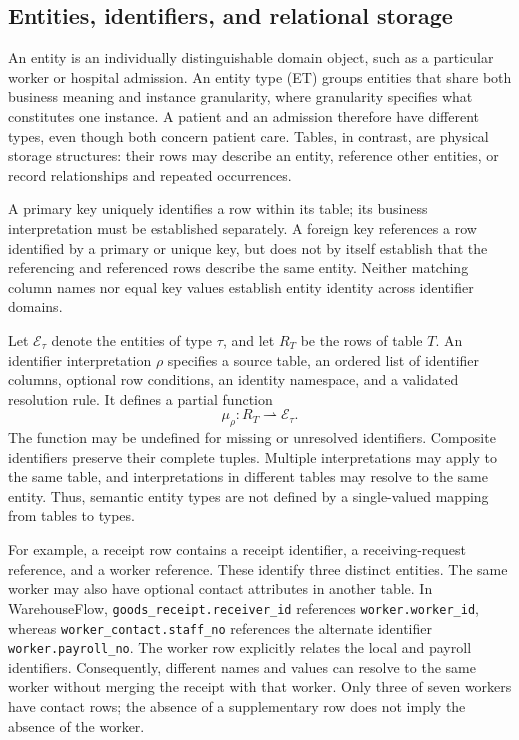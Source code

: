 \subsection{Entities, identifiers, and relational storage}
An entity is an individually distinguishable domain object, such as a particular worker or hospital admission. An entity type (ET) groups entities that share both business meaning and instance granularity, where granularity specifies what constitutes one instance. A patient and an admission therefore have different types, even though both concern patient care. Tables, in contrast, are physical storage structures: their rows may describe an entity, reference other entities, or record relationships and repeated occurrences.

A primary key uniquely identifies a row within its table; its business interpretation must be established separately. A foreign key references a row identified by a primary or unique key, but does not by itself establish that the referencing and referenced rows describe the same entity. Neither matching column names nor equal key values establish entity identity across identifier domains.

Let $\mathcal{E}_\tau$ denote the entities of type $\tau$, and let $R_T$ be the rows of table $T$. An identifier interpretation $\rho$ specifies a source table, an ordered list of identifier columns, optional row conditions, an identity namespace, and a validated resolution rule. It defines a partial function
\[
\mu_\rho:R_T\rightharpoonup\mathcal{E}_\tau.
\]
The function may be undefined for missing or unresolved identifiers. Composite identifiers preserve their complete tuples. Multiple interpretations may apply to the same table, and interpretations in different tables may resolve to the same entity. Thus, semantic entity types are not defined by a single-valued mapping from tables to types.

For example, a receipt row contains a receipt identifier, a receiving-request reference, and a worker reference. These identify three distinct entities. The same worker may also have optional contact attributes in another table. In WarehouseFlow, \texttt{goods\_receipt.receiver\_id} references \texttt{worker.worker\_id}, whereas \texttt{worker\_contact.staff\_no} references the alternate identifier \texttt{worker.payroll\_no}. The worker row explicitly relates the local and payroll identifiers. Consequently, different names and values can resolve to the same worker without merging the receipt with that worker. Only three of seven workers have contact rows; the absence of a supplementary row does not imply the absence of the worker.

